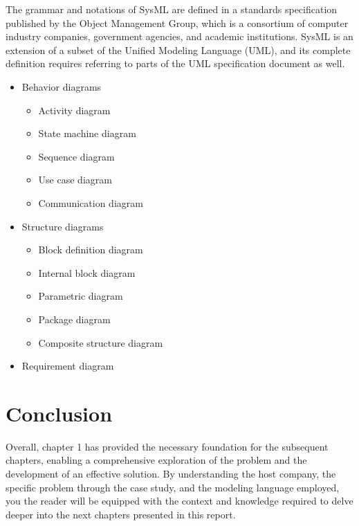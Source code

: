 The grammar and notations of SysML are defined in a standards specification published by the Object Management Group, which is a consortium of computer industry companies, government agencies, and academic institutions. SysML is an extension of a subset of the Unified Modeling Language (UML), and its complete definition requires referring to parts of the UML specification document as well.\cite{LD13}
\begin{itemize}
\item Behavior diagrams\cite{LD13}
\begin{itemize}
\item Activity diagram
\item State machine diagram
\item Sequence diagram
\item Use case diagram
\item Communication diagram
\end{itemize}
\item Structure diagrams\cite{LD13}
\begin{itemize}
\item Block definition diagram
\item Internal block diagram
\item Parametric diagram
\item Package diagram
\item Composite structure diagram
\end{itemize}
\item Requirement diagram\cite{LD13}
\end{itemize}
\vspace{1em}


\section{Conclusion}
Overall, chapter 1 has provided the necessary foundation for the subsequent chapters, enabling a comprehensive exploration of the problem and the development of an effective solution. By understanding the host company, the specific problem through the case study, and the modeling language employed, you the  reader will be  equipped with the context and knowledge required to delve deeper into the next chapters presented in this report.




%